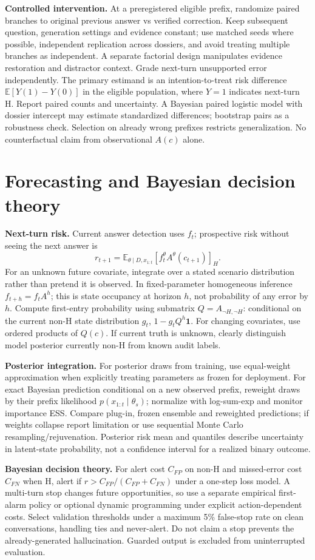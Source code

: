 \documentclass[11pt,letterpaper]{article}
\newcommand{\E}{\mathbb E}
\newcommand{\sectionpage}[1]{\clearpage\section{#1}}
\begin{document}
\textbf{Controlled intervention.} At a preregistered eligible prefix, randomize paired branches to original previous answer vs verified correction. Keep subsequent question, generation settings and evidence constant; use matched seeds where possible, independent replication across dossiers, and avoid treating multiple branches as independent. A separate factorial design manipulates evidence restoration and distractor context. Grade next-turn unsupported error independently. The primary estimand is an intention-to-treat risk difference $\E[Y(1)-Y(0)]$ in the eligible population, where $Y=1$ indicates next-turn H. Report paired counts and uncertainty. A Bayesian paired logistic model with dossier intercept may estimate standardized differences; bootstrap pairs as a robustness check. Selection on already wrong prefixes restricts generalization. No counterfactual claim from observational $A(c)$ alone.

\sectionpage{Forecasting and Bayesian decision theory}
\textbf{Next-turn risk.} Current answer detection uses $f_t$; prospective risk without seeing the next answer is
\[
r_{t+1}=\E_{\theta\mid D,x_{1:t}}[f_t^{\theta} A^\theta(c_{t+1})]_H.
\]
For an unknown future covariate, integrate over a stated scenario distribution rather than pretend it is observed. In fixed-parameter homogeneous inference $f_{t+h}=f_t A^h$; this is state occupancy at horizon $h$, not probability of any error by $h$. Compute first-entry probability using submatrix $Q=A_{\neg H,\neg H}$: conditional on the current non-H state distribution $g_t$, $1-g_t Q^h\mathbf 1$. For changing covariates, use ordered products of $Q(c)$. If current truth is unknown, clearly distinguish model posterior currently non-H from known audit labels.

\textbf{Posterior integration.} For posterior draws from training, use equal-weight approximation when explicitly treating parameters as frozen for deployment. For exact Bayesian prediction conditional on a new observed prefix, reweight draws by their prefix likelihood $p(x_{1:t}\mid\theta_s)$; normalize with log-sum-exp and monitor importance ESS. Compare plug-in, frozen ensemble and reweighted predictions; if weights collapse report limitation or use sequential Monte Carlo resampling/rejuvenation. Posterior risk mean and quantiles describe uncertainty in latent-state probability, not a confidence interval for a realized binary outcome.

\textbf{Bayesian decision theory.} For alert cost $C_{FP}$ on non-H and missed-error cost $C_{FN}$ when H, alert if
$r>C_{FP}/(C_{FP}+C_{FN})$ under a one-step loss model. A multi-turn stop changes future opportunities, so use a separate empirical first-alarm policy or optional dynamic programming under explicit action-dependent costs. Select validation thresholds under a maximum 5\% false-stop rate on clean conversations, handling ties and never-alert. Do not claim a stop prevents the already-generated hallucination. Guarded output is excluded from uninterrupted evaluation.
\end{document}
